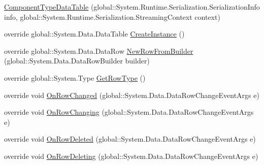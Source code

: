 \begin{DoxyCompactItemize}
\hyperlink{class_env_int_1_1_win32_1_1_field_tech_1_1_manager_1_1_data_sets_1_1_guide_ware_mobile_data_set_1_1_component_type_data_table_a997188bc3690b1470f36e4fd3ff68cd6}{Component\+Type\+Data\+Table} (global\+::\+System.\+Runtime.\+Serialization.\+Serialization\+Info info, global\+::\+System.\+Runtime.\+Serialization.\+Streaming\+Context context)
\item 
override global\+::\+System.\+Data.\+Data\+Table \hyperlink{class_env_int_1_1_win32_1_1_field_tech_1_1_manager_1_1_data_sets_1_1_guide_ware_mobile_data_set_1_1_component_type_data_table_a23faa4dbd2be8115644265331225719d}{Create\+Instance} ()
\item 
override global\+::\+System.\+Data.\+Data\+Row \hyperlink{class_env_int_1_1_win32_1_1_field_tech_1_1_manager_1_1_data_sets_1_1_guide_ware_mobile_data_set_1_1_component_type_data_table_ab70cd74f21544e385ea5ab38df6307e2}{New\+Row\+From\+Builder} (global\+::\+System.\+Data.\+Data\+Row\+Builder builder)
\item 
override global\+::\+System.\+Type \hyperlink{class_env_int_1_1_win32_1_1_field_tech_1_1_manager_1_1_data_sets_1_1_guide_ware_mobile_data_set_1_1_component_type_data_table_ade1398adf2c8c5143d6122d3432b7eb8}{Get\+Row\+Type} ()
\item 
override void \hyperlink{class_env_int_1_1_win32_1_1_field_tech_1_1_manager_1_1_data_sets_1_1_guide_ware_mobile_data_set_1_1_component_type_data_table_ad2db9b3a5d8c4e8195a08f8fd35b8ceb}{On\+Row\+Changed} (global\+::\+System.\+Data.\+Data\+Row\+Change\+Event\+Args e)
\item 
override void \hyperlink{class_env_int_1_1_win32_1_1_field_tech_1_1_manager_1_1_data_sets_1_1_guide_ware_mobile_data_set_1_1_component_type_data_table_a930e736ee3c91a992662e2a7b4faaa50}{On\+Row\+Changing} (global\+::\+System.\+Data.\+Data\+Row\+Change\+Event\+Args e)
\item 
override void \hyperlink{class_env_int_1_1_win32_1_1_field_tech_1_1_manager_1_1_data_sets_1_1_guide_ware_mobile_data_set_1_1_component_type_data_table_a5118a210129a589c1233864ed2ef9db6}{On\+Row\+Deleted} (global\+::\+System.\+Data.\+Data\+Row\+Change\+Event\+Args e)
\item 
override void \hyperlink{class_env_int_1_1_win32_1_1_field_tech_1_1_manager_1_1_data_sets_1_1_guide_ware_mobile_data_set_1_1_component_type_data_table_a8bd19d7ea77efed6555b2115eab51bf0}{On\+Row\+Deleting} (global\+::\+System.\+Data.\+Data\+Row\+Change\+Event\+Args e)
\end{DoxyCompactItemize}
